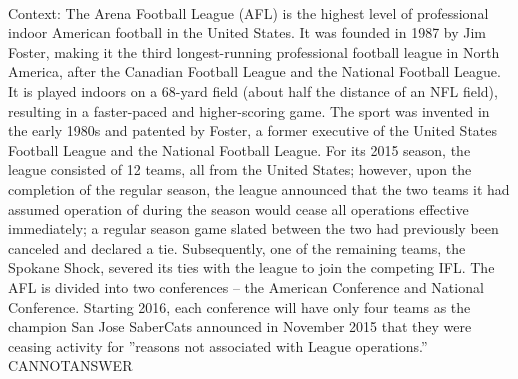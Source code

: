 \documentclass[11pt,a4paper, onecolumn]{article}
\begin{document}
\\ Context: The Arena Football League (AFL) is the highest level of professional indoor American football in the United States. It was founded in 1987 by Jim Foster, making it the third longest-running professional football league in North America, after the Canadian Football League and the National Football League. It is played indoors on a 68-yard field (about half the distance of an NFL field), resulting in a faster-paced and higher-scoring game. The sport was invented in the early 1980s and patented by Foster, a former executive of the United States Football League and the National Football League. For its 2015 season, the league consisted of 12 teams, all from the United States; however, upon the completion of the regular season, the league announced that the two teams it had assumed operation of during the season would cease all operations effective immediately; a regular season game slated between the two had previously been canceled and declared a tie. Subsequently, one of the remaining teams, the Spokane Shock, severed its ties with the league to join the competing IFL. The AFL is divided into two conferences – the American Conference and National Conference. Starting 2016, each conference will have only four teams as the champion San Jose SaberCats announced in November 2015 that they were ceasing activity for ''reasons not associated with League operations.'' CANNOTANSWER
\end{document}
